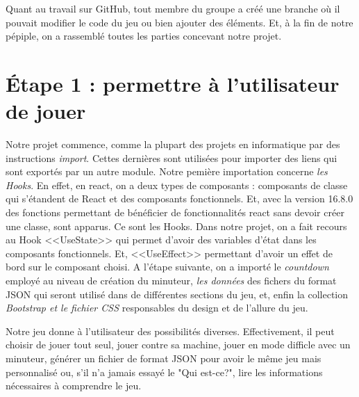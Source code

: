 \documentclass[a4paper, 12pt]{article}
\begin{document}
Quant au travail sur GitHub, tout membre du groupe a créé une branche où il pouvait modifier le code du jeu ou bien ajouter des éléments. Et, à la fin de notre pépiple, on a rassemblé toutes les parties concevant notre projet.\newpage

\section{Étape 1 : permettre à l'utilisateur de jouer}

Notre projet commence, comme la plupart des projets en informatique par des instructions \textit{import}. Cettes dernières sont utilisées pour importer des liens qui sont exportés par un autre module.\newline
Notre pemière importation concerne \textit{les Hooks}. En effet, en react, on a deux types de composants : composants de classe qui s'étandent de React et des composants fonctionnels. Et, avec la version 16.8.0 des fonctions permettant de bénéficier de fonctionnalités react sans devoir créer une classe, sont apparus. Ce sont les Hooks. Dans notre projet, on a fait recours au Hook <<UseState>> qui permet d'avoir des variables d'état dans les composants fonctionnels. Et, <<UseEffect>> permettant d'avoir un effet de bord sur le  composant choisi.\newline
A l'étape suivante, on a importé le \textit{ countdown } employé au niveau de création du minuteur, \textit{ les données } des fichers du format JSON qui seront utilisé dans de différentes sections du jeu, et, enfin la collection \textit{ Bootstrap et le fichier CSS} responsables du design et de l'allure du jeu. \newline

Notre jeu donne à l'utilisateur des possibilités diverses. Effectivement, il peut choisir de jouer tout seul, jouer contre sa machine, jouer en mode difficle avec un minuteur, générer un fichier de format JSON pour avoir le même jeu mais personnalisé ou, s'il n'a jamais essayé le "Qui est-ce?", lire les informations nécessaires à comprendre le jeu.  \newline
\end{document}
